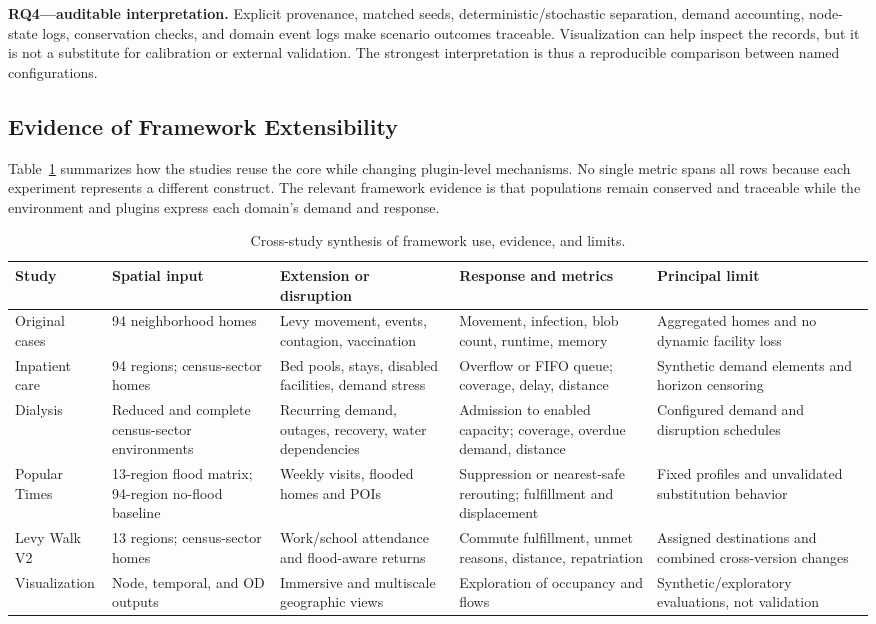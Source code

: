 \documentclass[pdflatex,sn-mathphys-num]{sn-jnl}%
\theoremstyle{thmstyleone}%
\theoremstyle{thmstyletwo}%
\theoremstyle{thmstylethree}%
\begin{document}
\textbf{RQ4---auditable interpretation.} Explicit provenance, matched seeds, deterministic/stochastic separation, demand accounting, node-state logs, conservation checks, and domain event logs make scenario outcomes traceable. Visualization can help inspect the records, but it is not a substitute for calibration or external validation. The strongest interpretation is thus a reproducible comparison between named configurations.

\subsection{Evidence of Framework Extensibility}

Table~\ref{tbl:cross_study_synthesis} summarizes how the studies reuse the core while changing plugin-level mechanisms. No single metric spans all rows because each experiment represents a different construct. The relevant framework evidence is that populations remain conserved and traceable while the environment and plugins express each domain's demand and response.

\begin{table}[ht]
\centering
\scriptsize
\caption{Cross-study synthesis of framework use, evidence, and limits.}
\label{tbl:cross_study_synthesis}
\begin{tabularx}{\linewidth}{@{}p{2.0cm}p{2.0cm}p{2.5cm}XX@{}}
\toprule
\textbf{Study} & \textbf{Spatial input} & \textbf{Extension or disruption} & \textbf{Response and metrics} & \textbf{Principal limit} \\ \midrule
Original cases & 94 neighborhood homes & Levy movement, events, contagion, vaccination & Movement, infection, blob count, runtime, memory & Aggregated homes and no dynamic facility loss \\ \midrule
Inpatient care & 94 regions; census-sector homes & Bed pools, stays, disabled facilities, demand stress & Overflow or FIFO queue; coverage, delay, distance & Synthetic demand elements and horizon censoring \\ \midrule
Dialysis & Reduced and complete census-sector environments & Recurring demand, outages, recovery, water dependencies & Admission to enabled capacity; coverage, overdue demand, distance & Configured demand and disruption schedules \\ \midrule
Popular Times & 13-region flood matrix; 94-region no-flood baseline & Weekly visits, flooded homes and POIs & Suppression or nearest-safe rerouting; fulfillment and displacement & Fixed profiles and unvalidated substitution behavior \\ \midrule
Levy Walk V2 & 13 regions; census-sector homes & Work/school attendance and flood-aware returns & Commute fulfillment, unmet reasons, distance, repatriation & Assigned destinations and combined cross-version changes \\ \midrule
Visualization & Node, temporal, and OD outputs & Immersive and multiscale geographic views & Exploration of occupancy and flows & Synthetic/exploratory evaluations, not validation \\ \bottomrule
\end{tabularx}
\end{table}
\end{document}
